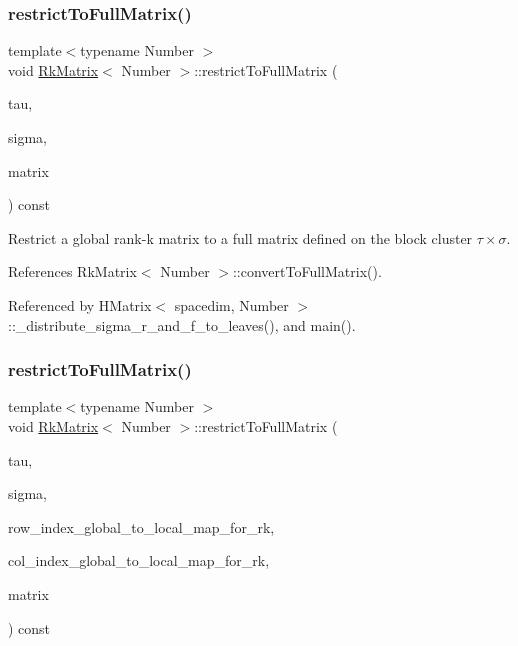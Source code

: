 \subsubsection{\texorpdfstring{restrict\+To\+Full\+Matrix()}{restrictToFullMatrix()}\hspace{0.1cm}{\footnotesize\ttfamily [1/2]}}
{\footnotesize\ttfamily template$<$typename Number $>$ \\
void \hyperlink{classRkMatrix}{Rk\+Matrix}$<$ Number $>$\+::restrict\+To\+Full\+Matrix (\begin{DoxyParamCaption}\item[{const std\+::vector$<$ types\+::global\+\_\+dof\+\_\+index $>$ \&}]{tau,  }\item[{const std\+::vector$<$ types\+::global\+\_\+dof\+\_\+index $>$ \&}]{sigma,  }\item[{\hyperlink{classLAPACKFullMatrixExt}{L\+A\+P\+A\+C\+K\+Full\+Matrix\+Ext}$<$ Number $>$ \&}]{matrix }\end{DoxyParamCaption}) const}

Restrict a global rank-\/k matrix to a full matrix defined on the block cluster $\tau \times \sigma$. 

References Rk\+Matrix$<$ Number $>$\+::convert\+To\+Full\+Matrix().



Referenced by H\+Matrix$<$ spacedim, Number $>$\+::\+\_\+distribute\+\_\+sigma\+\_\+r\+\_\+and\+\_\+f\+\_\+to\+\_\+leaves(), and main().

\mbox{\label{classRkMatrix_a0c529b22a8a38c4046a93c4a16ad39ca}} 
\subsubsection{\texorpdfstring{restrict\+To\+Full\+Matrix()}{restrictToFullMatrix()}\hspace{0.1cm}{\footnotesize\ttfamily [2/2]}}
{\footnotesize\ttfamily template$<$typename Number $>$ \\
void \hyperlink{classRkMatrix}{Rk\+Matrix}$<$ Number $>$\+::restrict\+To\+Full\+Matrix (\begin{DoxyParamCaption}\item[{const std\+::vector$<$ types\+::global\+\_\+dof\+\_\+index $>$ \&}]{tau,  }\item[{const std\+::vector$<$ types\+::global\+\_\+dof\+\_\+index $>$ \&}]{sigma,  }\item[{const std\+::map$<$ types\+::global\+\_\+dof\+\_\+index, size\+\_\+t $>$ \&}]{row\+\_\+index\+\_\+global\+\_\+to\+\_\+local\+\_\+map\+\_\+for\+\_\+rk,  }\item[{const std\+::map$<$ types\+::global\+\_\+dof\+\_\+index, size\+\_\+t $>$ \&}]{col\+\_\+index\+\_\+global\+\_\+to\+\_\+local\+\_\+map\+\_\+for\+\_\+rk,  }\item[{\hyperlink{classLAPACKFullMatrixExt}{L\+A\+P\+A\+C\+K\+Full\+Matrix\+Ext}$<$ Number $>$ \&}]{matrix }\end{DoxyParamCaption}) const}

